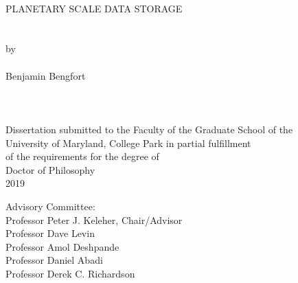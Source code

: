 
\thispagestyle{empty}
\hbox{\ }
\vspace{1in}
\renewcommand{\baselinestretch}{1}
\small\normalsize
\begin{center}

\large{{PLANETARY SCALE DATA STORAGE}}\\
\ \\
\ \\
\large{by} \\
\ \\
\large{Benjamin Bengfort}%
\ \\
\ \\
\ \\
\ \\
\normalsize
Dissertation submitted to the Faculty of the Graduate School of the \\
University of Maryland, College Park in partial fulfillment \\
of the requirements for the degree of \\
Doctor of Philosophy \\
2019
\end{center}

\vspace{7.5em}

\noindent Advisory Committee: \\
Professor Peter J. Keleher, Chair/Advisor \\
Professor Dave Levin \\
Professor Amol Deshpande \\
Professor Daniel Abadi \\
Professor Derek C. Richardson
